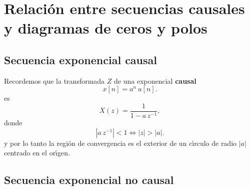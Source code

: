 \section{Relaci\'{o}n entre secuencias causales y diagramas de ceros y polos}

\subsection{Secuencia exponencial causal}

Recordemos que la transformada $Z$ de una exponencial \textbf{causal} 
\begin{equation}
x\left[ n\right] =a^{n} \, u\left[ n\right] .
\end{equation}
es
\begin{equation}
X\left( z\right) =\frac{1}{1-a \, z^{-1}},
\end{equation}
donde
\begin{equation}
 \left| a \, z^{-1}\right| <1 \Leftrightarrow \left| z\right| >\left|a\right| .
\end{equation}
y por lo tanto la regi\'{o}n de convergencia es el exterior de un c\'{\i}rculo de radio 
$\left| a\right| $ centrado en el or\'{\i}gen.

\subsection{Secuencia exponencial no causal}

